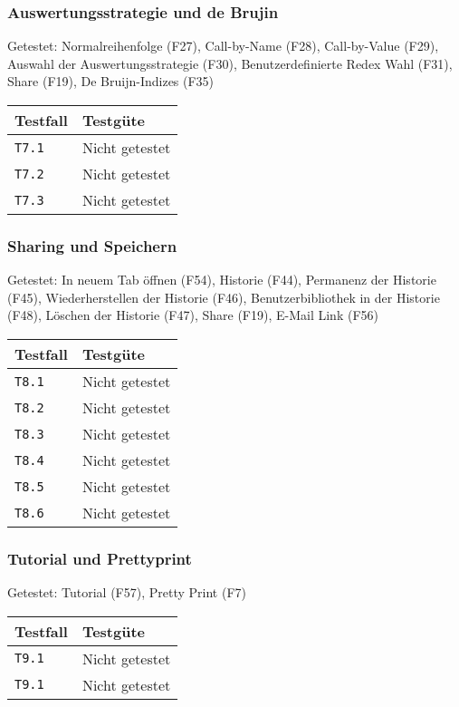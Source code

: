 \documentclass[parskip=full,11pt,twoside]{scrartcl}
\newcommand{\testline}[2]{
    \texttt{#1} & 
    \ifthenelse{\equal{#2}{Nicht getestet}}
        {\cellcolor{red!20}}
        {}
    \ifthenelse{\equal{#2}{Manuell getestet}}
        {\cellcolor{orange!20}}
        {}
    \ifthenelse{\equal{#2}{Automatisiert getestet}}
        {\cellcolor{green!20}}
        {}
    #2 \\ \hline
}
\begin{document}
\subsubsection{Auswertungsstrategie und de Brujin}
    Getestet:
    Normalreihenfolge (F27),
    Call-by-Name (F28),
    Call-by-Value (F29),
    Auswahl der Auswertungsstrategie (F30),
    Benutzerdefinierte Redex Wahl (F31),
    Share (F19),
    De Bruijn-Indizes (F35)

    \label{shortcuts}
    \begin{center}
        \begin{tabular}{ p{9cm} p{4cm}}
            Testfall & Testgüte \\ \hline
            \testline{T7.1}{Nicht getestet}
            \testline{T7.2}{Nicht getestet}
            \testline{T7.3}{Nicht getestet}
        \end{tabular}
    \end{center}

\subsubsection{Sharing und Speichern}
    Getestet:
    In neuem Tab öffnen (F54),
    Historie (F44),
    Permanenz der Historie (F45),
    Wiederherstellen der Historie (F46),
    Benutzerbibliothek in der Historie (F48),
    Löschen der Historie (F47),
    Share (F19),
    E-Mail Link (F56)

    \label{shortcuts}
    \begin{center}
        \begin{tabular}{ p{9cm} p{4cm}}
            Testfall & Testgüte \\ \hline
            \testline{T8.1}{Nicht getestet}
            \testline{T8.2}{Nicht getestet}
            \testline{T8.3}{Nicht getestet}
            \testline{T8.4}{Nicht getestet}
            \testline{T8.5}{Nicht getestet}
            \testline{T8.6}{Nicht getestet}
        \end{tabular}
    \end{center}

\subsubsection{Tutorial und Prettyprint}
    Getestet:
    Tutorial (F57),
    Pretty Print (F7)

    \label{shortcuts}
    \begin{center}
        \begin{tabular}{ p{9cm} p{4cm}}
            Testfall & Testgüte \\ \hline
            \testline{T9.1}{Nicht getestet}
            \testline{T9.1}{Nicht getestet}
        \end{tabular}
    \end{center}
\end{document}
